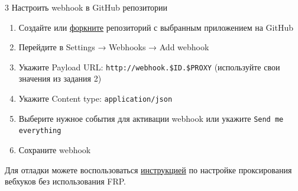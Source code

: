 \documentclass[12pt,a4paper]{article}
\begin{document}
\begin{task}{3}
    Настроить webhook в GitHub репозитории
    
    \begin{enumerate}
        \item Создайте или \href{https://docs.github.com/en/pull-requests/collaborating-with-pull-requests/working-with-forks/fork-a-repo}{форкните} репозиторий с выбранным приложением на GitHub
        \item Перейдите в Settings → Webhooks → Add webhook
        \item Укажите Payload URL: \texttt{http://webhook.\$ID.\$PROXY} (используйте свои значения из задания 2)
        \item Укажите Content type: \texttt{application/json}
        \item Выберите нужное события для активации webhook или укажите \texttt{Send me everything}
        \item Сохраните webhook
    \end{enumerate}

    Для отладки можете воспользоваться \href{https://docs.github.com/en/webhooks/testing-and-troubleshooting-webhooks/testing-webhooks#testing-webhook-code-locally}{инструкцией} по настройке проксирования вебхуков без использования FRP.
\end{task}
\end{document}
